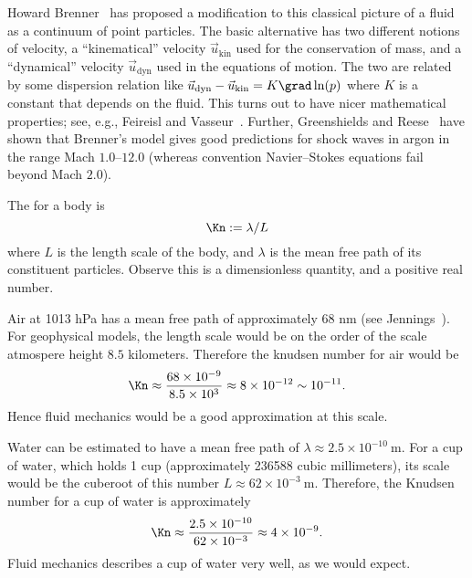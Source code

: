 \begin{node}
\begin{node}
\begin{node}\label{fluids:describing-000H}%
Howard Brenner~\cite{brenner2005kinematics,brenner2005navier,brenner2006fluid} has proposed a modification to this classical picture of
a fluid as a continuum of point particles. The basic alternative has two
different notions of velocity, a ``kinematical'' velocity
$\vec{u}_{\text{kin}}$ used for the conservation of mass, and a
``dynamical'' velocity $\vec{u}_{\text{dyn}}$ used in the equations
of motion. The two are related by some dispersion relation like
$\vec{u}_{\text{dyn}}-\vec{u}_{\text{kin}}=K\grad\ln(p)$ where $K$ is a
constant that depends on the fluid. This turns out to have nicer
mathematical properties; see, e.g., Feireisl and Vasseur~\cite{feireisl2010new}.
Further, Greenshields and Reese~\cite{greenshields2007structure} have
shown that Brenner's model gives good predictions for shock waves in
argon in the range Mach $1.0$--$12.0$ (whereas convention Navier--Stokes
equations fail beyond Mach $2.0$).
\end{node} %
\end{node} %

\begin{definition}\label{fluids:describing-000C}%
The  for a body is
\begin{equation}
\Kn := \lambda/L
\end{equation}
where $L$ is the length scale of the body, and $\lambda$ is the mean
free path of its constituent particles. Observe this is a dimensionless
quantity, and a positive real number.

\begin{example}\label{fluids:describing-000E}%
Air at 1013 hPa has a mean free path of approximately 68 nm (see
Jennings~\cite{jennings1988air}). For geophysical models, the length
scale would be on the order of the scale atmospere height $8.5$
kilometers. Therefore the knudsen number for air would be
\begin{equation}
\Kn\approx\frac{68\times 10^{-9}}{8.5\times 10^{3}}\approx8\times 10^{-12}\sim10^{-11}.
\end{equation}
Hence fluid mechanics would be a good approximation at this scale.
\end{example}

\begin{example}\label{fluids:describing-000G}%
Water can be estimated to have a mean free path of
$\lambda\approx2.5\times10^{-10}~\mathrm{m}$. For a cup of water, which
holds 1 cup (approximately 236588 cubic millimeters), its scale would be
the cuberoot of this number $L\approx 62\times10^{-3}~\mathrm{m}$.
Therefore, the Knudsen number for a cup of water is approximately
\begin{equation}
\Kn\approx\frac{2.5\times10^{-10}}{62\times10^{-3}}\approx4\times10^{-9}.
\end{equation}
Fluid mechanics describes a cup of water very well, as we would expect.
\end{example}
\end{definition}


\end{node}

